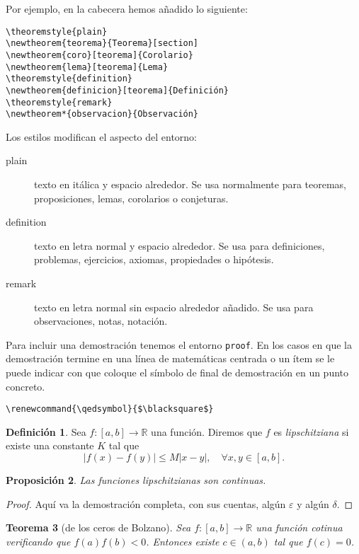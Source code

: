 \documentclass{article}
\numberwithin{equation}{section}
\theoremstyle{plain}
\newtheorem{teorema}{Teorema}[section]
\newtheorem{prop}[teorema]{Proposición}
\theoremstyle{definition}
\newtheorem{definicion}[teorema]{Definición}
\theoremstyle{remark}
\begin{document}
Por ejemplo, en la cabecera hemos añadido lo siguiente:
\begin{verbatim}
\theoremstyle{plain}
\newtheorem{teorema}{Teorema}[section]
\newtheorem{coro}[teorema]{Corolario}
\newtheorem{lema}[teorema]{Lema}
\theoremstyle{definition}
\newtheorem{definicion}[teorema]{Definición}
\theoremstyle{remark}
\newtheorem*{observacion}{Observación} 
\end{verbatim}

Los estilos modifican el aspecto del entorno:
\begin{description}
    \item[plain] texto en itálica y espacio alrededor. Se usa normalmente para teoremas, proposiciones, lemas, corolarios o conjeturas.
    \item[definition] texto en letra normal y espacio alrededor. Se usa para definiciones, problemas, ejercicios, axiomas, propiedades o hipótesis.
    \item[remark] texto en letra normal sin espacio alrededor añadido. Se usa para observaciones, notas, notación. 
\end{description}

Para incluir una demostración tenemos el entorno \texttt{proof}. En los casos en que la demostración termine en una línea de matemáticas centrada o un ítem se le puede indicar con \texttt{\qedhere} que coloque el símbolo de final de demostración en un punto concreto.

\begin{verbatim}
\renewcommand{\qedsymbol}{$\blacksquare$}
\end{verbatim}

\begin{codigo-arriba}
\begin{definicion}
Sea $f \colon [a,b] \to \mathbb{R}$ una función. Diremos que $f$ es \emph{lipschitziana} si existe una constante $K$ tal que 
\[
\left| f(x)-f(y) \right| \leq M \left| x-y \right|, \quad \forall x,y \in [a,b].
\]
\end{definicion}

\begin{prop}
Las funciones lipschitzianas son continuas.
\end{prop}
\begin{proof}
Aquí va la demostración completa, con sus cuentas, algún $\varepsilon$ y algún $\delta$.
\end{proof}

\begin{teorema}[de los ceros de Bolzano]
Sea $f \colon [a,b] \to \mathbb{R}$ una función cotinua verificando que $f(a)f(b)<0$. Entonces existe $c \in (a,b)$ tal que $f(c)=0$.
\end{teorema}
\end{codigo-arriba}
\end{document}
